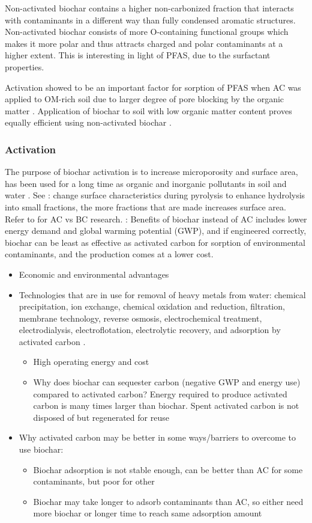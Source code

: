 Non-activated biochar contains a higher non-carbonized fraction that interacts with contaminants in a different way than fully condensed aromatic structures. Non-activated biochar consists of more O-containing functional groups which makes it more polar and thus attracts charged and polar contaminants at a higher extent. This is interesting in light of PFAS, due to the surfactant properties. 

Activation showed to be an important factor for sorption of PFAS when AC was applied to OM-rich soil due to larger degree of pore blocking by the organic matter \citep{Sormo2021}. Application of biochar to soil with low organic matter content proves equally efficient using non-activated biochar \citep{Alhashimi2017}. 

\subsubsection{Activation}
The purpose of biochar activation is to increase microporosity and surface area, has been used for a long time as organic and inorganic pollutants in soil and water \citep{Ahmad2014}. 
See \citep{Li2019}: change surface characteristics during pyrolysis to enhance hydrolysis into small fractions, the more fractions that are made increases surface area. 
Refer to \citep{Li2019} for AC vs BC research. 
\citep{Alhashimi2017}: Benefits of biochar instead of AC includes lower energy demand and global warming potential (GWP), and if engineered correctly, biochar can be least as effective as activated carbon for sorption of environmental contaminants, and the production comes at a lower cost. 

\begin{itemize}
\item Economic and environmental advantages
\item Technologies that are in use for removal of heavy metals from water: chemical precipitation, ion exchange, chemical oxidation and reduction, filtration, membrane technology, reverse osmosis, electrochemical treatment, electrodialysis, electroflotation, electrolytic recovery, and adsorption by activated carbon \citep{schroder2010,du2014adsorption}. 
\begin{itemize}
\item High operating energy and cost
\item Why does biochar can sequester carbon (negative GWP and energy use) compared to activated carbon? Energy required to produce activated carbon is many times larger than biochar. Spent activated carbon is not disposed of but regenerated for reuse
\end{itemize}
\item Why activated carbon may be better in some ways/barriers to overcome to use biochar:
\begin{itemize}
\item Biochar adsorption is not stable enough, can be better than AC for some contaminants, but poor for other
\item Biochar may take longer to adsorb contaminants than AC, so either need more biochar or longer time to reach same adsorption amount
\end{itemize}
\end{itemize}


